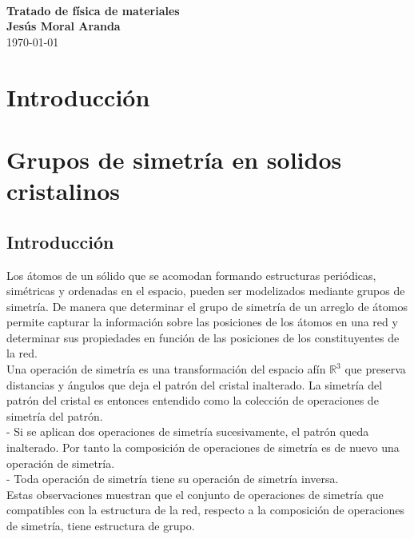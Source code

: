 \documentclass{report}
\begin{document}
\begin{center}

\textbf{}\\
\vspace{10cm}

\vspace{.2cm}
\textbf{Tratado de física de materiales}\\
\vspace{.2cm}
\textbf{Jesús Moral Aranda}\\
\vspace{.2cm}
\today
\end{center}
\newpage
\tableofcontents


\newpage
\chapter{Introducción}
\newpage
\chapter{Grupos de simetría en solidos cristalinos}
\section{Introducción}
Los átomos de un sólido que se acomodan formando estructuras periódicas, simétricas y ordenadas en el espacio, pueden ser modelizados mediante grupos de simetría. De manera que determinar el grupo de simetría de un arreglo de átomos permite capturar la información sobre las posiciones de los átomos en una red y determinar sus propiedades en función de las posiciones de los constituyentes de la red.\\

Una operación de simetría es una transformación del espacio afín  $\mathbb{R}^3$ que preserva distancias y ángulos que deja el patrón del cristal inalterado. La simetría del patrón del cristal es entonces entendido como la colección de operaciones de simetría del patrón.\\

- Si se aplican dos operaciones de simetría sucesivamente, el patrón queda inalterado. Por tanto la composición de operaciones de simetría es de nuevo una operación de simetría.\\

- Toda operación de simetría tiene su operación de simetría inversa.\\

Estas observaciones muestran que el conjunto de operaciones de simetría que compatibles con la estructura de la red, respecto a la composición de operaciones de simetría, tiene estructura de grupo.\\
\end{document}
